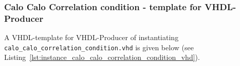 \clearpage

\subsubsection{Calo Calo Correlation condition - template for VHDL-Producer}
A VHDL-template for VHDL-Producer of instantiating \texttt{calo\_calo\_correlation\_condition.vhd} is given below (see Listing~\ref{lst:instance_calo_calo_correlation_condition_vhd}).\\



